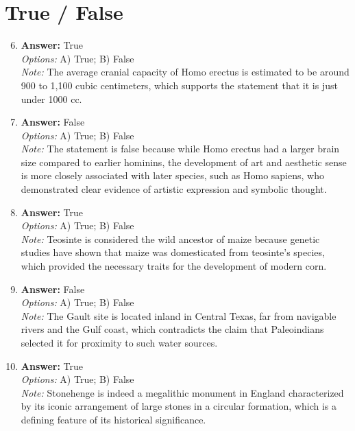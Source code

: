 \documentclass[12pt]{article}
\begin{document}
\section*{True / False}
\begin{enumerate}[label=\arabic*.]
\setcounter{enumi}{5}
\item \textbf{Answer:} True
\\ \textit{Options:} A) True; B) False
\\ \textit{Note:} The average cranial capacity of Homo erectus is estimated to be around 900 to 1,100 cubic centimeters, which supports the statement that it is just under 1000 cc.
\item \textbf{Answer:} False
\\ \textit{Options:} A) True; B) False
\\ \textit{Note:} The statement is false because while Homo erectus had a larger brain size compared to earlier hominins, the development of art and aesthetic sense is more closely associated with later species, such as Homo sapiens, who demonstrated clear evidence of artistic expression and symbolic thought.
\item \textbf{Answer:} True
\\ \textit{Options:} A) True; B) False
\\ \textit{Note:} Teosinte is considered the wild ancestor of maize because genetic studies have shown that maize was domesticated from teosinte's species, which provided the necessary traits for the development of modern corn.
\item \textbf{Answer:} False
\\ \textit{Options:} A) True; B) False
\\ \textit{Note:} The Gault site is located inland in Central Texas, far from navigable rivers and the Gulf coast, which contradicts the claim that Paleoindians selected it for proximity to such water sources.
\item \textbf{Answer:} True
\\ \textit{Options:} A) True; B) False
\\ \textit{Note:} Stonehenge is indeed a megalithic monument in England characterized by its iconic arrangement of large stones in a circular formation, which is a defining feature of its historical significance.
\end{enumerate}
\end{document}
